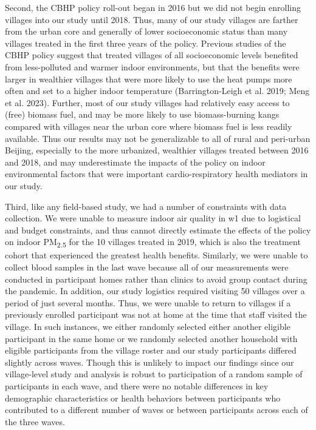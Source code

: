 \documentclass[
  letterpaper,
  DIV=11,
  numbers=noendperiod]{scrartcl}
\begin{document}
Second, the CBHP policy roll-out began in 2016 but we did not begin
enrolling villages into our study until 2018. Thus, many of our study
villages are farther from the urban core and generally of lower
socioeconomic status than many villages treated in the first three years
of the policy. Previous studies of the CBHP policy suggest that treated
villages of all socioeconomic levels benefited from less-polluted and
warmer indoor environments, but that the benefits were larger in
wealthier villages that were more likely to use the heat pumps more
often and set to a higher indoor temperature (Barrington-Leigh et al.
2019; Meng et al. 2023). Further, most of our study villages had
relatively easy access to (free) biomass fuel, and may be more likely to
use biomass-burning kangs compared with villages near the urban core
where biomass fuel is less readily available. Thus our results may not
be generalizable to all of rural and peri-urban Beijing, especially to
the more urbanized, wealthier villages treated between 2016 and 2018,
and may underestimate the impacts of the policy on indoor environmental
factors that were important cardio-respiratory health mediators in our
study.

Third, like any field-based study, we had a number of constraints with
data collection. We were unable to measure indoor air quality in w1 due
to logistical and budget constraints, and thus cannot directly estimate
the effects of the policy on indoor PM\textsubscript{2.5} for the 10
villages treated in 2019, which is also the treatment cohort that
experienced the greatest health benefits. Similarly, we were unable to
collect blood samples in the last wave because all of our measurements
were conducted in participant homes rather than clinics to avoid group
contact during the pandemic. In addition, our study logistics required
visiting 50 villages over a period of just several months. Thus, we were
unable to return to villages if a previously enrolled participant was
not at home at the time that staff visited the village. In such
instances, we either randomly selected either another eligible
participant in the same home or we randomly selected another household
with eligible participants from the village roster and our study
participants differed slightly across waves. Though this is unlikely to
impact our findings since our village-level study and analysis is robust
to participation of a random sample of participants in each wave, and
there were no notable differences in key demographic characteristics or
health behaviors between participants who contributed to a different
number of waves or between participants across each of the three waves.
\end{document}
